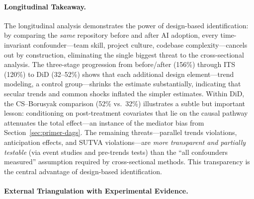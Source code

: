 \paragraph{Longitudinal Takeaway.}
\label{sec:longitudinal-takeaway}

The longitudinal analysis demonstrates the power of design-based identification: by comparing the \emph{same} repository before and after AI adoption, every time-invariant confounder---team skill, project culture, codebase complexity---cancels out by construction, eliminating the single biggest threat to the cross-sectional analysis.
The three-stage progression from before/after (156\%) through ITS (120\%) to DiD (32--52\%) shows that each additional design element---trend modeling, a control group---shrinks the estimate substantially, indicating that secular trends and common shocks inflated the simpler estimates.
Within DiD, the CS--Borusyak comparison (52\% vs.\ 32\%) illustrates a subtle but important lesson: conditioning on post-treatment covariates that lie on the causal pathway attenuates the total effect---an instance of the mediator bias from Section~\ref{sec:primer-dags}.
The remaining threats---parallel trends violations, anticipation effects, and SUTVA violations---are \emph{more transparent and partially testable} (via event studies and pre-trends tests) than the ``all confounders measured'' assumption required by cross-sectional methods.
This transparency is the central advantage of design-based identification.

\paragraph{External Triangulation with Experimental Evidence.}
\label{sec:triangulation}

